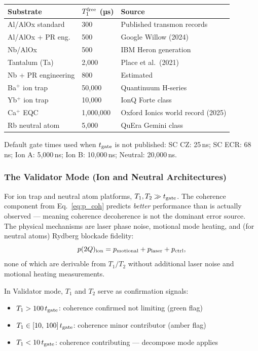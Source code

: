 \documentclass[12pt,a4paper]{article}
\begin{document}
\begin{center}
\begin{tabular}{lll}
\toprule
\textbf{Substrate} & \textbf{$T_1^{\rm free}$ (µs)} & \textbf{Source} \\
\midrule
Al/AlOx standard     &    300 & Published transmon records \\
Al/AlOx + PR eng.    &    500 & Google Willow (2024) \\
Nb/AlOx              &    500 & IBM Heron generation \\
Tantalum (Ta)        &  2,000 & Place et al.\ (2021) \\
Nb + PR engineering  &    800 & Estimated \\
Ba$^+$ ion trap      & 50,000 & Quantinuum H-series \\
Yb$^+$ ion trap      & 10,000 & IonQ Forte class \\
Ca$^+$ EQC           & 1,000,000 & Oxford Ionics world record (2025) \\
Rb neutral atom      &  5,000 & QuEra Gemini class \\
\bottomrule
\end{tabular}
\end{center}

Default gate times used when $t_{\rm gate}$ is not published:
SC CZ: 25\,ns; SC ECR: 68\,ns; Ion A: 5,000\,ns; Ion B: 10,000\,ns;
Neutral: 20,000\,ns.

\subsubsection{The Validator Mode (Ion and Neutral Architectures)}
\label{sec:validator_mode}

For ion trap and neutral atom platforms, $T_1, T_2 \gg t_{\rm gate}$.
The coherence component from Eq.~\eqref{eq:p_coh} predicts
\emph{better} performance than is actually observed --- meaning
coherence decoherence is not the dominant error source.
The physical mechanisms are laser phase noise, motional mode heating,
and (for neutral atoms) Rydberg blockade fidelity:
\begin{equation}
p(2Q)_{\rm ion} = p_{\rm motional} + p_{\rm laser} + p_{\rm ctrl},
\end{equation}
none of which are derivable from $T_1/T_2$ without additional
laser noise and motional heating measurements.

In Validator mode, $T_1$ and $T_2$ serve as confirmation signals:
\begin{itemize}[leftmargin=2em,itemsep=2pt]
\item $T_1 > 100\,t_{\rm gate}$: coherence confirmed not limiting (green flag)
\item $T_1 \in [10,\,100]\,t_{\rm gate}$: coherence minor contributor (amber flag)
\item $T_1 < 10\,t_{\rm gate}$: coherence contributing --- decompose mode applies
\end{itemize}
\end{document}
